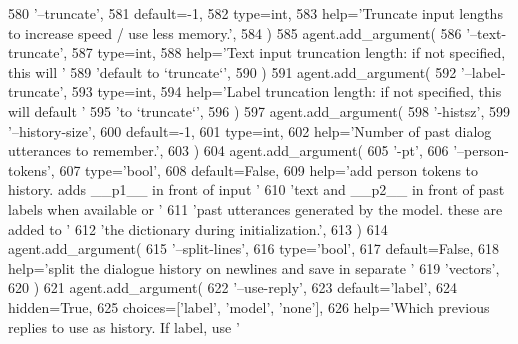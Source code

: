 \begin{DoxyCode}
580             \textcolor{stringliteral}{'--truncate'},
581             default=-1,
582             type=int,
583             help=\textcolor{stringliteral}{'Truncate input lengths to increase speed / use less memory.'},
584         )
585         agent.add\_argument(
586             \textcolor{stringliteral}{'--text-truncate'},
587             type=int,
588             help=\textcolor{stringliteral}{'Text input truncation length: if not specified, this will '}
589             \textcolor{stringliteral}{'default to `truncate`'},
590         )
591         agent.add\_argument(
592             \textcolor{stringliteral}{'--label-truncate'},
593             type=int,
594             help=\textcolor{stringliteral}{'Label truncation length: if not specified, this will default '}
595             \textcolor{stringliteral}{'to `truncate`'},
596         )
597         agent.add\_argument(
598             \textcolor{stringliteral}{'-histsz'},
599             \textcolor{stringliteral}{'--history-size'},
600             default=-1,
601             type=int,
602             help=\textcolor{stringliteral}{'Number of past dialog utterances to remember.'},
603         )
604         agent.add\_argument(
605             \textcolor{stringliteral}{'-pt'},
606             \textcolor{stringliteral}{'--person-tokens'},
607             type=\textcolor{stringliteral}{'bool'},
608             default=\textcolor{keyword}{False},
609             help=\textcolor{stringliteral}{'add person tokens to history. adds \_\_p1\_\_ in front of input '}
610             \textcolor{stringliteral}{'text and \_\_p2\_\_ in front of past labels when available or '}
611             \textcolor{stringliteral}{'past utterances generated by the model. these are added to '}
612             \textcolor{stringliteral}{'the dictionary during initialization.'},
613         )
614         agent.add\_argument(
615             \textcolor{stringliteral}{'--split-lines'},
616             type=\textcolor{stringliteral}{'bool'},
617             default=\textcolor{keyword}{False},
618             help=\textcolor{stringliteral}{'split the dialogue history on newlines and save in separate '}
619             \textcolor{stringliteral}{'vectors'},
620         )
621         agent.add\_argument(
622             \textcolor{stringliteral}{'--use-reply'},
623             default=\textcolor{stringliteral}{'label'},
624             hidden=\textcolor{keyword}{True},
625             choices=[\textcolor{stringliteral}{'label'}, \textcolor{stringliteral}{'model'}, \textcolor{stringliteral}{'none'}],
626             help=\textcolor{stringliteral}{'Which previous replies to use as history. If label, use '}

\end{DoxyCode}
